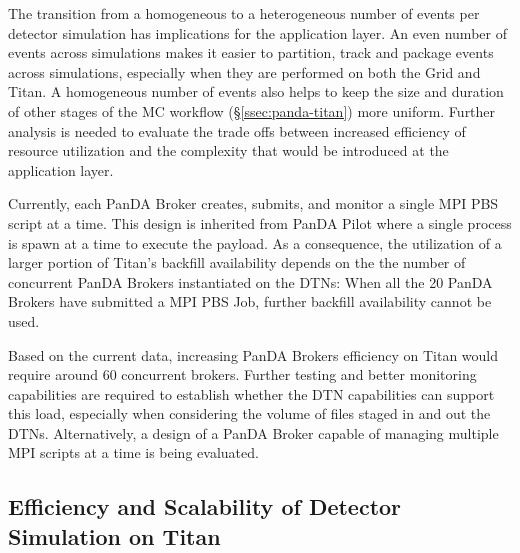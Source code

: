 The transition from a homogeneous to a heterogeneous number of events per
detector simulation has implications for the application layer. An even number
of events across simulations makes it easier to partition, track and package
events across simulations, especially when they are performed on both the Grid
and Titan. A homogeneous number of events also helps to keep the size and
duration of other stages of the MC workflow (\S\ref{ssec:panda-titan}) more
uniform. Further analysis is needed to evaluate the trade offs between increased
efficiency of resource utilization and the complexity that would be introduced
at the application layer.

Currently, each PanDA Broker creates, submits, and monitor a single MPI PBS
script at a time. This design is inherited from PanDA Pilot where a single
process is spawn at a time to execute the payload. As a consequence, the
utilization of a larger portion of Titan's backfill availability depends on the
the number of concurrent PanDA Brokers instantiated on the DTNs: When all the 20
PanDA Brokers have submitted a MPI PBS Job, further backfill availability cannot
be used.

Based on the current data, increasing PanDA Brokers efficiency on Titan would
require around 60 concurrent brokers. Further testing and better monitoring
capabilities are required to establish whether the DTN capabilities can support
this load, especially when considering the volume of files staged in and out the
DTNs. Alternatively, a design of a PanDA Broker capable of managing multiple MPI
scripts at a time is being evaluated.



\subsection{Efficiency and Scalability of Detector Simulation on Titan}
\label{ssec:panda_titan}



